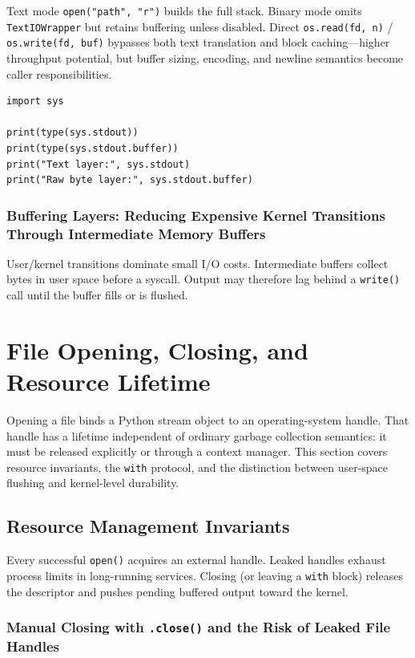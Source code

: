 \documentclass[a4paper,twoside]{report}
\begin{document}
Text mode \texttt{open("path", "r")} builds the full stack. Binary mode omits \texttt{TextIOWrapper} but retains buffering unless disabled. Direct \texttt{os.read(fd, n)} / \texttt{os.write(fd, buf)} bypasses both text translation and block caching---higher throughput potential, but buffer sizing, encoding, and newline semantics become caller responsibilities.

\begin{verbatim}
import sys

print(type(sys.stdout))
print(type(sys.stdout.buffer))
print("Text layer:", sys.stdout)
print("Raw byte layer:", sys.stdout.buffer)
\end{verbatim}

\subsubsection{Buffering Layers: Reducing Expensive Kernel Transitions Through Intermediate Memory Buffers}

User/kernel transitions dominate small I/O costs. Intermediate buffers collect bytes in user space before a syscall. Output may therefore lag behind a \texttt{write()} call until the buffer fills or is flushed.


\section{File Opening, Closing, and Resource Lifetime}

Opening a file binds a Python stream object to an operating-system handle. That handle has a lifetime independent of ordinary garbage collection semantics: it must be released explicitly or through a context manager. This section covers resource invariants, the \texttt{with} protocol, and the distinction between user-space flushing and kernel-level durability.


\subsection{Resource Management Invariants}

Every successful \texttt{open()} acquires an external handle. Leaked handles exhaust process limits in long-running services. Closing (or leaving a \texttt{with} block) releases the descriptor and pushes pending buffered output toward the kernel.

\subsubsection{Manual Closing with \texttt{.close()} and the Risk of Leaked File Handles}
\end{document}
